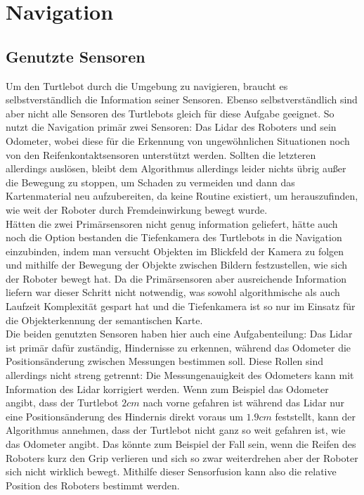 \section{Navigation}\label{sec:navigation}
\subsection{Genutzte Sensoren}\label{subsec:genutzte-sensoren}
Um den Turtlebot durch die Umgebung zu navigieren, braucht es selbstverständlich die Information seiner Sensoren.
Ebenso selbstverständlich sind aber nicht alle Sensoren des Turtlebots gleich für diese Aufgabe geeignet.
So nutzt die Navigation primär zwei Sensoren: Das Lidar des Roboters und sein Odometer, wobei diese für die Erkennung
von ungewöhnlichen Situationen noch von den Reifenkontaktsensoren unterstützt werden.
Sollten die letzteren allerdings auslösen, bleibt dem Algorithmus allerdings leider nichts übrig außer die Bewegung zu
stoppen, um Schaden zu vermeiden und dann das Kartenmaterial neu aufzubereiten, da keine Routine existiert, um herauszufinden,
wie weit der Roboter durch Fremdeinwirkung bewegt wurde.\\


Hätten die zwei Primärsensoren nicht genug information geliefert, hätte auch noch die Option bestanden die Tiefenkamera
des Turtlebots in die Navigation einzubinden, indem man versucht Objekten im Blickfeld der Kamera zu folgen und mithilfe
der Bewegung der Objekte zwischen Bildern festzustellen, wie sich der Roboter bewegt hat.
Da die Primärsensoren aber ausreichende Information liefern war dieser Schritt nicht notwendig, was sowohl algorithmische
als auch Laufzeit Komplexität gespart hat und die Tiefenkamera ist so nur im Einsatz für die Objekterkennung der semantischen
Karte.\\

Die beiden genutzten Sensoren haben hier auch eine Aufgabenteilung: Das Lidar ist primär dafür zuständig, Hindernisse zu
erkennen, während das Odometer die Positionsänderung zwischen Messungen bestimmen soll.
Diese Rollen sind allerdings nicht streng getrennt: Die Messungenauigkeit des Odometers kann mit Information des Lidar
korrigiert werden.
Wenn zum Beispiel das Odometer angibt, dass der Turtlebot $2cm$ nach vorne gefahren ist während das Lidar nur eine
Positionsänderung des Hindernis direkt voraus um $1.9cm$ feststellt, kann der Algorithmus annehmen, dass der Turtlebot
nicht ganz so weit gefahren ist, wie das Odometer angibt.
Das könnte zum Beispiel der Fall sein, wenn die Reifen des Roboters kurz den Grip verlieren und sich so zwar weiterdrehen
aber der Roboter sich nicht wirklich bewegt.
Mithilfe dieser Sensorfusion kann also die relative Position des Roboters bestimmt werden.\\

